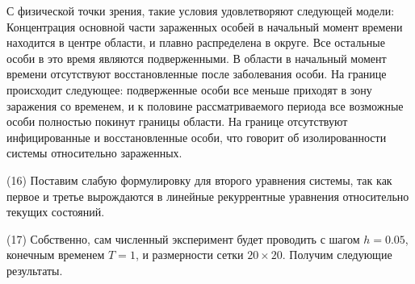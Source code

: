 \documentclass[14pt, a4paper]{extarticle}
\begin{document}
	С физической точки зрения, такие условия удовлетворяют следующей модели: Концентрация основной части зараженных особей в начальный момент времени находится в центре области, и плавно распределена в округе. Все остальные особи в это время являются подверженными. В области в начальный момент времени отсутствуют восстановленные после заболевания особи. На границе происходит следующее: подверженные особи все меньше приходят в зону заражения со временем, и к половине рассматриваемого периода все возможные особи полностью покинут границы области. На границе отсутствуют инфицированные и восстановленные особи, что говорит об изолированности системы относительно зараженных.

	(16) Поставим слабую формулировку для второго уравнения системы, так как первое и третье вырождаются в линейные рекуррентные уравнения относительно текущих состояний.

	(17) Собственно, сам численный эксперимент будет проводить с шагом $h = 0.05$, конечным временем $T = 1$, и размерности сетки $20 \times 20$. Получим следующие результаты.
\end{document}
